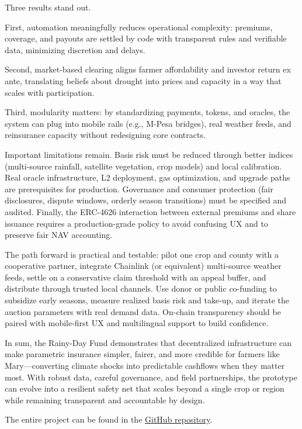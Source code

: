 \documentclass[11pt,a4paper]{article}
\begin{document}
		Three results stand out.

        First, automation meaningfully reduces operational complexity: premiums, coverage, and payouts are settled by code with transparent rules and verifiable data, minimizing discretion and delays.

        Second, market-based clearing aligns farmer affordability and investor return ex ante, translating beliefs about drought into prices and capacity in a way that scales with participation.

        Third, modularity matters: by standardizing payments, tokens, and oracles, the system can plug into mobile rails (e.g., M-Pesa bridges), real weather feeds, and reinsurance capacity without redesigning core contracts.

		Important limitations remain.
        Basis risk must be reduced through better indices (multi-source rainfall, satellite vegetation, crop models) and local calibration.
        Real oracle infrastructure, L2 deployment, gas optimization, and upgrade paths are prerequisites for production.
        Governance and consumer protection (fair disclosures, dispute windows, orderly season transitions) must be specified and audited.
        Finally, the ERC-4626 interaction between external premiums and share issuance requires a production-grade policy to avoid confusing UX and to preserve fair NAV accounting.

		The path forward is practical and testable: pilot one crop and county with a cooperative partner, integrate Chainlink (or equivalent) multi-source weather feeds, settle on a conservative claim threshold with an appeal buffer, and distribute through trusted local channels.
        Use donor or public co-funding to subsidize early seasons, measure realized basis risk and take-up, and iterate the auction parameters with real demand data.
        On-chain transparency should be paired with mobile-first UX and multilingual support to build confidence.

		In sum, the Rainy-Day Fund demonstrates that decentralized infrastructure can make parametric insurance simpler, fairer, and more credible for farmers like Mary—converting climate shocks into predictable cashflows when they matter most.
        With robust data, careful governance, and field partnerships, the prototype can evolve into a resilient safety net that scales beyond a single crop or region while remaining transparent and accountable by design.

	    The entire project can be found in the \href{https://github.com/vincentschall/decentralized_weather_insurance}{GitHub repository}.
\end{document}
